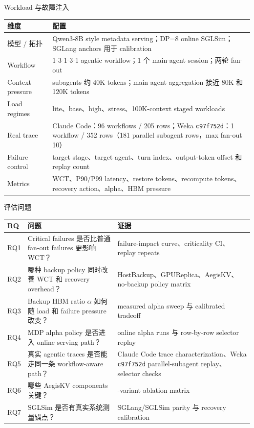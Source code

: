 \documentclass[aspectratio=43]{beamer}
\newcommand{\Critical}{Critical}
\newcommand{\code}[1]{\texttt{\footnotesize #1}}
\begin{document}
\begin{frame}{Workload 与故障注入}
  \scriptsize
  \renewcommand{\arraystretch}{1.12}
  \begin{tabular}{p{}p{}}
    \toprule
    维度 & 配置 \\
    \midrule
    模型 / 拓扑 & Qwen3-8B style metadata serving；DP=8 online SGLSim；SGLang anchors 用于 calibration \\
    Workflow & 1-3-1-3-1 agentic workflow；1 个 main-agent session；两轮 fan-out \\
    Context pressure & subagents 约 40K tokens；main-agent aggregation 接近 80K 和 120K tokens \\
    Load regimes & lite、base、high、stress、100K-context staged workloads \\
    Real trace & Claude Code：96 workflows / 205 rows；Weka \code{c97f752d}：1 workflow / 352 rows（181 parallel subagent rows，max fan-out 10） \\
    Failure control & target stage、target agent、turn index、output-token offset 和 replay count \\
    Metrics & WCT、P90/P99 latency、restore tokens、recompute tokens、recovery action、alpha、HBM pressure \\
    \bottomrule
  \end{tabular}
\end{frame}

\begin{frame}{评估问题}
  \scriptsize
  \renewcommand{\arraystretch}{1.12}
  \begin{tabular}{
    >{\raggedright\arraybackslash}p{}
    >{\raggedright\arraybackslash}p{}
    >{\raggedright\arraybackslash}p{}
  }
    \toprule
    RQ & 问题 & 证据 \\
    \midrule
    RQ1 & \Critical{} failures 是否比普通 fan-out failures 更影响 WCT？ & failure-impact curve、criticality CI、replay repeats \\
    RQ2 & 哪种 backup policy 同时改善 WCT 和 recovery overhead？ & HostBackup、GPUReplica、AegisKV、no-backup policy matrix \\
    RQ3 & Backup HBM ratio $\alpha$ 如何随 load 和 failure pressure 改变？ & measured alpha sweep 与 calibrated tradeoff \\
    RQ4 & MDP alpha policy 是否进入 online serving path？ & online alpha runs 与 row-by-row selector replay \\
    RQ5 & 真实 agentic traces 是否能走同一条 workflow-aware path？ & Claude Code trace characterization、Weka \code{c97f752d} parallel-subagent replay、selector checks \\
    RQ6 & 哪些 AegisKV components 关键？ & 11-variant ablation matrix \\
    RQ7 & SGLSim 是否有真实系统测量锚点？ & SGLang/SGLSim parity 与 recovery calibration \\
    \bottomrule
  \end{tabular}
\end{frame}
\end{document}
